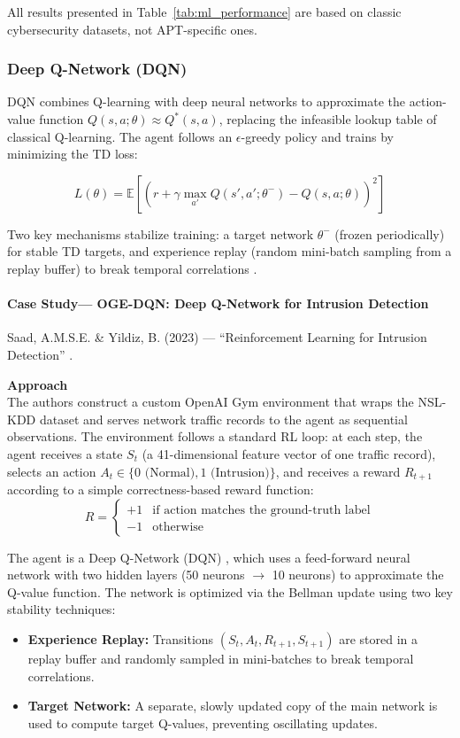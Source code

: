 All results presented in Table~\ref{tab:ml_performance} are based on classic cybersecurity datasets, not APT-specific ones.


\subsubsection{Deep Q-Network (DQN)}
DQN combines Q-learning \cite{watkins1989learning,watkins1992qlearning} with deep neural networks to approximate the action-value function \( Q(s,a;\theta) \approx Q^*(s,a) \), replacing the infeasible lookup table of classical Q-learning. The agent follows an $\epsilon$-greedy policy and trains by minimizing the TD loss:

\[ 
L(\theta) = \mathbb{E} \left[ \left( r + \gamma \max_{a'} Q(s',a';\theta^-) - Q(s,a;\theta) \right)^2 \right] 
\]

Two key mechanisms stabilize training: a target network $\theta^-$ (frozen periodically) for stable TD targets, and experience replay (random mini-batch sampling from a replay buffer) to break temporal correlations \cite{mnih2015human}.

\paragraph{Case Study--- OGE-DQN: Deep Q-Network for Intrusion Detection}
Saad, A.M.S.E. \& Yildiz, B. (2023) --- ``Reinforcement Learning for Intrusion Detection'' \cite{saad2023reinforcement}.

\textbf{Approach} \\
The authors construct a custom OpenAI Gym environment that wraps the NSL-KDD dataset and serves network traffic records to the agent as sequential observations. The environment follows a standard RL loop: at each step, the agent receives a state $S_t$ (a 41-dimensional feature vector of one traffic record), selects an action $A_t \in \{0 \text{ (Normal)}, 1 \text{ (Intrusion)}\}$, and receives a reward $R_{t+1}$ according to a simple correctness-based reward function:
\[
R = \begin{cases} 
+1 & \text{if action matches the ground-truth label} \\ 
-1 & \text{otherwise} 
\end{cases}
\]

The agent is a Deep Q-Network (DQN) \cite{mnih2015human}, which uses a feed-forward neural network with two hidden layers (50 neurons $\rightarrow$ 10 neurons) to approximate the Q-value function. The network is optimized via the Bellman update using two key stability techniques:
\begin{itemize}
    \item \textbf{Experience Replay:} Transitions $(S_t, A_t, R_{t+1}, S_{t+1})$ are stored in a replay buffer and randomly sampled in mini-batches to break temporal correlations.
    \item \textbf{Target Network:} A separate, slowly updated copy of the main network is used to compute target Q-values, preventing oscillating updates.
\end{itemize}

